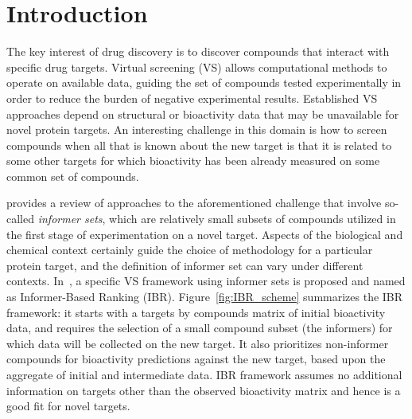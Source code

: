 \documentclass[11pt,a4paper]{article}
\theoremstyle{plain}
\begin{document}
\section{Introduction}
The key interest of drug discovery is to discover compounds that interact with specific drug targets. 
Virtual screening (VS) allows computational methods to operate on available data, guiding the set of compounds tested experimentally in order to reduce the burden of negative experimental results.  
Established VS approaches depend on structural or bioactivity data that may be unavailable for novel protein targets.   
An interesting challenge in this domain is how to screen compounds when all that is known about the new target is that it is related to some other targets for which bioactivity has been already measured on some common set of compounds.

\cite{clemons_use_2021} provides a review of approaches to the aforementioned challenge that involve so-called {\em informer sets}, which are relatively small subsets of compounds utilized in the first stage of experimentation on a novel target.  
Aspects of the biological and chemical context certainly guide the choice of methodology for a particular protein target, and the definition of informer set can vary under different contexts. 
In~\cite{zhang_predicting_2019}, a specific VS framework using informer sets is proposed and named as Informer-Based Ranking (IBR).  
Figure~\ref{fig:IBR_scheme} summarizes the IBR framework: it starts with a targets by compounds matrix of initial bioactivity data, and requires the selection of a small compound subset (the informers) for which data will be collected on the new target.  
It also prioritizes non-informer compounds for bioactivity predictions against the new target, based upon the aggregate of initial and intermediate data.  
IBR framework assumes no additional information on targets other than the observed bioactivity matrix and hence is a good fit for novel targets. 
  
\end{document}
